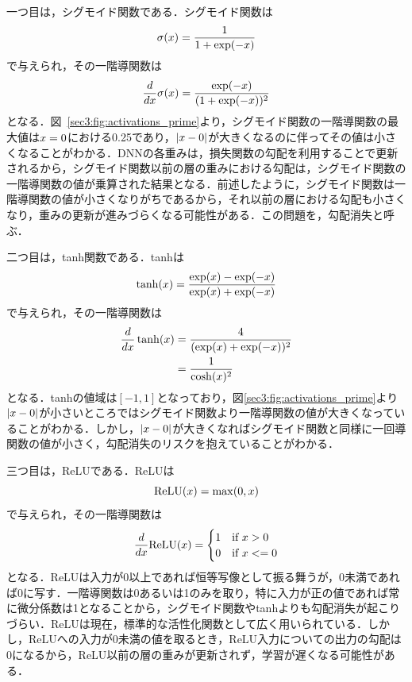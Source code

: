 \documentclass[12pt]{jarticle}
\numberwithin{equation}{section}    %
\numberwithin{figure}{section}      %
\numberwithin{table}{section}      %
\begin{document}
一つ目は，シグモイド関数である．シグモイド関数は
\begin{equation}
    \sigma(x) = \frac{1}{1 + \exp(-x)}
\end{equation}
で与えられ，その一階導関数は
\begin{equation}
    \frac{d}{dx}\sigma(x) = \frac{\exp(-x)}{(1 + \exp(-x))^{2}}
\end{equation}
となる．図~\ref{sec3:fig:activations_prime}より，シグモイド関数の一階導関数の最大値は$x=0$における0.25であり，$|x - 0|$が大きくなるのに伴ってその値は小さくなることがわかる．DNNの各重みは，損失関数の勾配を利用することで更新されるから，シグモイド関数以前の層の重みにおける勾配は，シグモイド関数の一階導関数の値が乗算された結果となる．前述したように，シグモイド関数は一階導関数の値が小さくなりがちであるから，それ以前の層における勾配も小さくなり，重みの更新が進みづらくなる可能性がある．この問題を，勾配消失と呼ぶ．

二つ目は，tanh関数である．tanhは
\begin{equation}
    \tanh(x) = \frac{\exp(x) - \exp(-x)}{\exp(x) + \exp(-x)}
\end{equation}
で与えられ，その一階導関数は
\begin{align}
    \frac{d}{dx}\tanh(x) & = \frac{4}{(\exp(x) + \exp(-x))^{2}} \\
                                   & = \frac{1}{\cosh(x)^{2}}
\end{align}
となる．tanhの値域は$[-1, 1]$となっており，図\ref{sec3:fig:activations_prime}より$|x - 0|$が小さいところではシグモイド関数より一階導関数の値が大きくなっていることがわかる．しかし，$|x - 0|$が大きくなればシグモイド関数と同様に一回導関数の値が小さく，勾配消失のリスクを抱えていることがわかる．

三つ目は，ReLUである．ReLUは
\begin{equation}
    \text{ReLU}(x) = \max (0, x)
\end{equation}
で与えられ，その一階導関数は
\begin{equation}
    \frac{d}{dx}\text{ReLU}(x) =
    \begin{cases}
        1 & \text{if $x > 0$}  \\
        0 & \text{if $x <= 0$}
    \end{cases}
\end{equation}
となる．ReLUは入力が0以上であれば恒等写像として振る舞うが，0未満であれば0に写す．一階導関数は0あるいは1のみを取り，特に入力が正の値であれば常に微分係数は1となることから，シグモイド関数やtanhよりも勾配消失が起こりづらい．ReLUは現在，標準的な活性化関数として広く用いられている．しかし，ReLUへの入力が0未満の値を取るとき，ReLU入力についての出力の勾配は0になるから，ReLU以前の層の重みが更新されず，学習が遅くなる可能性がある．
\end{document}
